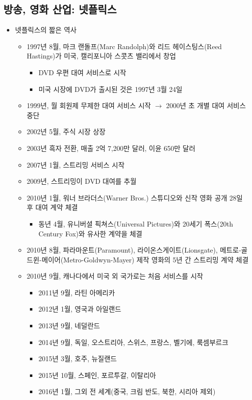 \subsection{방송, 영화 산업: 넷플릭스}
\begin{itemize}
\item 넷플릭스의 짧은 역사
	\begin{itemize}
	\item 1997년 8월, 마크 랜돌프(Marc Randolph)와 리드 헤이스팅스(Reed Hastings)가 미국, 캘리포니아 스콧츠 밸리에서 창업
		\begin{itemize}
		\item DVD 우편 대여 서비스로 시작
		\item 미국 시장에 DVD가 출시된 것은 1997년 3월 24일	
		\end{itemize}
	\item 1999년, 월 회원제 무제한 대여 서비스 시작 $\rightarrow$ 2000년 초 개별 대여 서비스 중단
	\item 2002년 5월, 주식 시장 상장
	\item 2003년 흑자 전환, 매출 2억 7,200만 달러, 이윤 650만 달러
	\item 2007년 1월, 스트리밍 서비스 시작
	\item 2009년, 스트리밍이 DVD 대여를 추월
	\item 2010년 1월, 워너 브라더스(Warner Bros.) 스튜디오와 신작 영화 공개 28일 후 대여 계약 체결
		\begin{itemize}
		\item	동년 4월, 유니버셜 픽쳐스(Universal Pictures)와 20세기 폭스(20th Century Fox)와 유사한 계약을 체결
		\end{itemize}
	\item 2010년 8월, 파라마운트(Paramount), 라이온스게이트(Lionsgate), 메트로-골드윈-메이어(Metro-Goldwyn-Mayer) 제작 영화의 5년 간 스트리밍 계약 체결 
	\item 2010년 9월, 캐나다에서 미국 외 국가로는 처음 서비스를 시작
		\begin{itemize}
		\item 2011년 9월, 라틴 아메리카
		\item 2012년 1월, 영국과 아일랜드
		\item 2013년 9월, 네덜란드
		\item 2014년 9월, 독일, 오스트리아, 스위스, 프랑스, 벨기에, 룩셈부르크
		\item 2015년 3월, 호주, 뉴질랜드
		\item 2015년 10월, 스페인, 포르투갈, 이탈리아
		\item 2016년 1월, 그외 전 세계(중국, 크림 반도, 북한, 시리아 제외)

\end{itemize}
\end{itemize}
\end{itemize}
